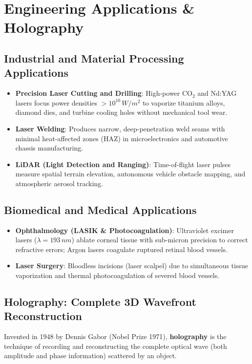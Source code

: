 \section{Engineering Applications \& Holography}

\subsection{Industrial and Material Processing Applications}
\begin{itemize}
    \item \textbf{Precision Laser Cutting and Drilling}: High-power $\text{CO}_2$ and Nd:YAG lasers focus power densities $> 10^{10}\,\si{W/m^2}$ to vaporize titanium alloys, diamond dies, and turbine cooling holes without mechanical tool wear.
    \item \textbf{Laser Welding}: Produces narrow, deep-penetration weld seams with minimal heat-affected zones (HAZ) in microelectronics and automotive chassis manufacturing.
    \item \textbf{LiDAR (Light Detection and Ranging)}: Time-of-flight laser pulses measure spatial terrain elevation, autonomous vehicle obstacle mapping, and atmospheric aerosol tracking.
\end{itemize}

\subsection{Biomedical and Medical Applications}
\begin{itemize}
    \item \textbf{Ophthalmology (LASIK \& Photocoagulation)}: Ultraviolet excimer lasers ($\lambda = 193\,\si{nm}$) ablate corneal tissue with sub-micron precision to correct refractive errors; Argon lasers coagulate ruptured retinal blood vessels.
    \item \textbf{Laser Surgery}: Bloodless incisions (laser scalpel) due to simultaneous tissue vaporization and thermal photocoagulation of severed blood vessels.
\end{itemize}

\subsection{Holography: Complete 3D Wavefront Reconstruction}
Invented in 1948 by Dennis Gabor (Nobel Prize 1971), \textbf{holography} is the technique of recording and reconstructing the complete optical wave (both amplitude and phase information) scattered by an object.

